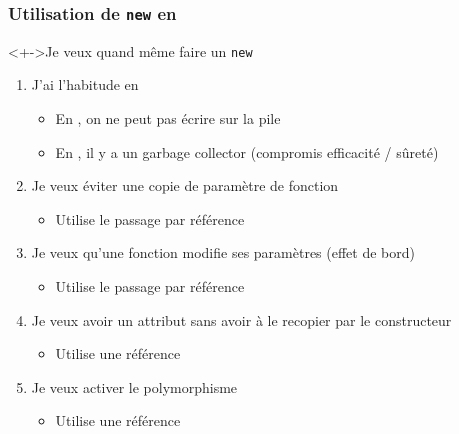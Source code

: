 \begin{frame}
\frametitle{Utilisation de \texttt{new} en \cpp}
\begin{exampleblock}<+->{Je veux quand même faire un \texttt{new}}
	\begin{enumerate}[<+->]
	\item J'ai l'habitude en \java
			\begin{itemize}
			\item En \java, on ne peut pas écrire sur la pile
			\item En \java, il y a un garbage collector (compromis efficacité / sûreté)
			\end{itemize}
	\item Je veux éviter une copie de paramètre de fonction
		\begin{itemize}
		\item Utilise le passage par référence
		\end{itemize}
	\item Je veux qu'une fonction modifie ses paramètres (effet de bord)
		\begin{itemize}
		\item Utilise le passage par référence
		\end{itemize}
	\item Je veux avoir un attribut sans avoir à le recopier par le constructeur
		\begin{itemize}
		\item Utilise une référence
		\end{itemize}
	\item Je veux activer le polymorphisme
		\begin{itemize}
		\item Utilise une référence
		\end{itemize}
	\end{enumerate}
\end{exampleblock}
\end{frame}

